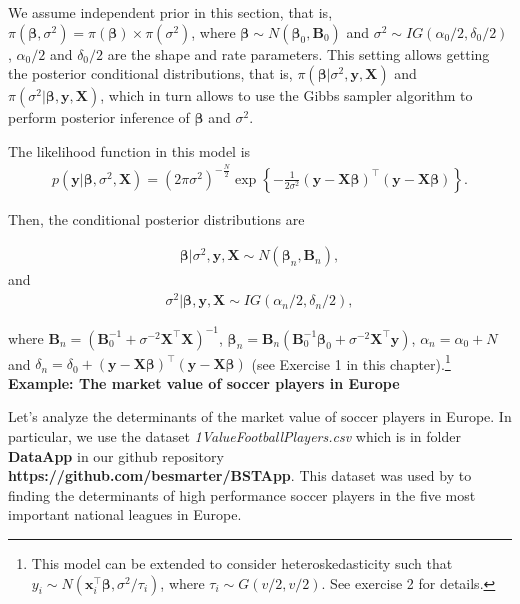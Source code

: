 We assume independent prior in this section, that is, $\pi(\bm{\beta},\sigma^2)=\pi(\bm{\beta})\times\pi(\sigma^2)$, where $\bm{\beta} \sim N(\bm{\beta}_0, {\bm{B}}_0)$ and $\sigma^2 \sim IG(\alpha_0/2, \delta_0/2)$, $\alpha_0/2$ and $\delta_0/2$ are the shape and rate parameters. This setting allows getting the posterior conditional distributions, that is, $\pi(\bm{\beta}|\sigma^2,{\bm{y}}, {\bm{X}})$ and $\pi(\sigma^2|\bm{\beta},{\bm{y}}, {\bm{X}})$, which in turn allows to use the Gibbs sampler algorithm to perform posterior inference of $\bm{\beta}$ and $\sigma^2$.

The likelihood function in this model is
\begin{align*}
	p({\bm{y}}| \bm{\beta}, \sigma^2, {\bm{X}}) = (2\pi\sigma^2)^{-\frac{N}{2}} \exp \left\{-\frac{1}{2\sigma^2} ({\bm{y}} - \bm{X\bm{\beta}})^{\top}({\bm{y}} - \bm{X\bm{\beta}}) \right\}.
\end{align*}

Then, the conditional posterior distributions are

\begin{align*}
	\bm{\beta}|\sigma^2, {\bm{y}}, {\bm{X}} \sim N(\bm{\beta}_n, {\bm{B}}_n),
\end{align*}
and
\begin{align*}
	\sigma^2|\bm{\beta}, {\bm{y}}, {\bm{X}} \sim IG(\alpha_n/2, \delta_n/2),
\end{align*}

 where ${\bm{B}}_n = ({\bm{B}}_0^{-1} + \sigma^{-2} {\bm{X}}^{\top}{\bm{X}})^{-1}$, $\bm{\beta}_n= {\bm{B}}_n({\bm{B}}_0^{-1}\bm{\beta}_0 + \sigma^{-2} {\bm{X}}^{\top}{\bm{y}})$, $\alpha_n = \alpha_0 + N$ and $\delta_n = \delta_0 + ({\bm{y}}-{\bm{X}}\bm{\beta})^{\top}({\bm{y}}-{\bm{X}}\bm{\beta})$ (see Exercise 1 in this chapter).\footnote{This model can be extended to consider heteroskedasticity such that $y_i\sim N({\bm{x}}_i^{\top}\bm{\beta}, \sigma^2/\tau_i)$, where $\tau_i\sim G(v/2,v/2)$. See exercise 2 for details.}\\

\textbf{Example: The market value of soccer players in Europe}

Let's analyze the determinants of the market value of soccer players in Europe. In particular, we use the dataset \textit{1ValueFootballPlayers.csv} which is in folder \textbf{DataApp} in our github repository \textbf{https://github.com/besmarter/BSTApp}. This dataset was used by \cite{Serna2018} to finding the determinants of high performance soccer players in the five most important national leagues in Europe.

